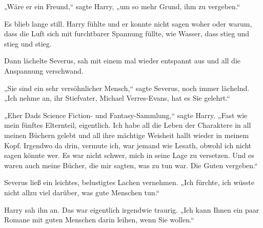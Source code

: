 „Wäre er ein Freund,“ sagte Harry, „um so mehr Grund, ihm zu vergeben.“

Es blieb lange still. Harry fühlte und er konnte nicht sagen woher oder warum, dass die Luft sich mit furchtbarer Spannung füllte, wie Wasser, dass stieg und stieg und stieg.

Dann lächelte Severus, sah mit einem mal wieder entspannt aus und all die Anspannung verschwand.

„Sie sind ein sehr versöhnlicher Mensch,“ sagte Severus, noch immer lächelnd. „Ich nehme an, ihr Stiefvater, Michael Verres-Evans, hat es Sie gelehrt.“

„Eher Dads Science Fiction- und Fantasy-Sammlung,“ sagte Harry. „Fast wie mein fünftes Elternteil, eigentlich. Ich habe all die Leben der Charaktere in all meinen Büchern gelebt und all ihre mächtige Weisheit hallt wieder in meinem Kopf. Irgendwo da drin, vermute ich, war jemand wie Lesath, obwohl ich nicht sagen könnte wer. Es war nicht schwer, mich in seine Lage zu versetzen. Und es waren auch meine Bücher, die mir sagten, was zu tun war. Die Guten vergeben.“

Severus ließ ein leichtes, belustigtes Lachen vernehmen. „Ich fürchte, ich wüsste nicht allzu viel darüber, was gute Menschen tun.“

Harry sah ihn an. Das war eigentlich irgendwie traurig. „Ich kann Ihnen ein paar Romane mit guten Menschen darin leihen, wenn Sie wollen.“

